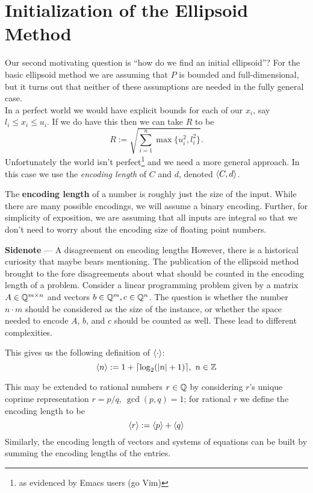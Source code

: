 \section{Initialization of the Ellipsoid Method}
Our second motivating question is ``how do we find an initial ellipsoid''? For
the basic ellipsoid method we are assuming that \(P\) is bounded and
full-dimensional, but it turns out that neither of these assumptions are needed
in the fully general case.\\

In a perfect world we would have explicit bounds for each of our \(x_i\), say
\(l_i \leq x_i \leq u_i\). If we do have this then we can take \(R\) to be
%
\[R := \sqrt{\sum_{i=1}^n \max\{u_i^2, l_i^2\}}.\]
%
Unfortunately the world isn't perfect\footnote{as evidenced by Emacs users (go
Vim)} and we need a more general approach. In this case we use the
\textit{encoding length} of \(C\) and \(d\), denoted \(\langle {C, d} \rangle\).

The \textbf{encoding length} of a number is roughly just the size of the input.
While there are many possible encodings, we will assume a binary encoding.
Further, for simplicity of exposition, we are assuming that all inputs are
integral so that we don't need to worry about the encoding size of floating
point numbers.\\

\begin{sidenotebox}{\textbf{Sidenote} --- A disagreement on encoding lengths}
However, there is a historical curiosity that maybe bears mentioning. The
publication of the ellipsoid method brought to the fore disagreements about what
should be counted in the encoding length of a problem. Consider a linear
programming problem given by a matrix \(A \in \mathbb Q^{m \times n}\) and vectors \(b
\in \mathbb Q^m, c \in \mathbb Q^n\). The question is whether the number \(n \cdot m\) should
be considered as the size of the instance, or whether the space needed to encode
\(A\), \(b\), and \(c\) should be counted as well. These lead to different
complexities.
\end{sidenotebox}

This gives us the following definition of \(\langle {\cdot} \rangle \):
\begin{equation} \label{eq:encode-length-int}
  \langle {n} \rangle := 1 + \lceil \log_2(|n| + 1)\rceil,\ n \in \mathbb Z
\end{equation}

This may be extended to rational numbers \(r \in \mathbb Q\) by considering \(r\)'s
unique coprime representation \(r = p/q,\ \gcd(p, q) = 1\); for rational \(r\)
we define the encoding length to be
%
\begin{equation} \label{eq:encode-length-rational}
\langle {r} \rangle := \langle {p} \rangle + \langle {q} \rangle
\end{equation}
Similarly, the encoding length of vectors and systems of equations can be built
by summing the encoding lengths of the entries.

